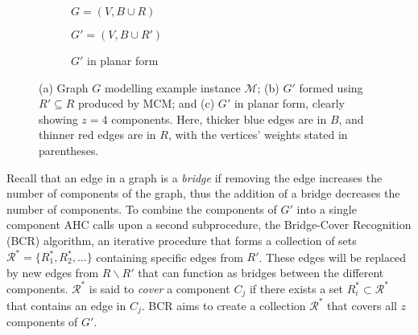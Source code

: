 \documentclass[authoryear]{elsarticle}
\begin{document}
\begin{figure}[H]	
	\centering
	\begin{subfigure}[h]{0.33\textwidth}
		
		\caption{$G = (V, B \cup R)$}
		\label{fig:threshold}
	\end{subfigure} \hspace{5mm}
	\begin{subfigure}[h]{0.33\textwidth}
		
		\caption{$G' = (V, B \cup R')$}
		\label{fig:matching}
	\end{subfigure} \hspace{5mm}
	\begin{subfigure}[h]{0.2\textwidth}
		
		\caption{$G'$ in planar form}
		\label{fig:mps}
	\end{subfigure}
	\caption{(a) Graph $G$ modelling example instance $\mathcal{M}$; (b) $G'$ formed using $R' \subseteq R$ produced by MCM; and (c) $G'$ in planar form, clearly showing $z = 4$ components. Here, thicker blue edges are in $B$, and thinner red edges are in $R$, with the vertices' weights stated in parentheses.}
	\label{fig:mcm}
\end{figure}

\noindent Recall that an edge in a graph is a \emph{bridge} if removing the edge increases the number of components of the graph, thus the addition of a bridge decreases the number of components. To combine the components of $G'$ into a single component AHC calls upon a second subprocedure, the Bridge-Cover Recognition (BCR) algorithm, an iterative procedure that forms a collection of sets $\mathcal{R}^* = \{R^*_1, R^*_2, \dots\}$ containing specific edges from $R'$. These edges will be replaced by new edges from $R\backslash R'$ that can function as bridges between the different components. $\mathcal{R}^*$ is said to \emph{cover} a component $C_j$ if there exists a set $R^*_i \subset \mathcal{R}^*$ that contains an edge in $C_j$. BCR aims to create a collection $\mathcal{R}^*$ that covers all $z$ components of $G'$.
\end{document}
